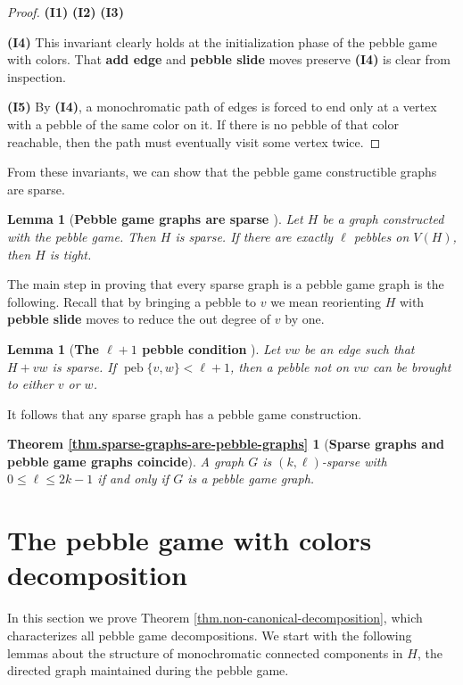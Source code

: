 \documentclass[11pt]{article}
\newtheorem{lemma}[theorem]{Lemma}
\newcommand{\refthm}[1]{Theorem \ref{thm.#1}}
\newcommand{\labellem}[1]{\label{lem.#1}}
\newcommand{\restateenv}{ZZZ}
\newenvironment{restate}[1]{
  \renewcommand{\restateenv}{restate.#1}
  \newtheorem*{\restateenv}{\refthm{#1}}
  \begin{\restateenv}
}{\end{\restateenv}}
\newcommand{\peb}{\ensuremath{\operatorname{peb}}}
\begin{document}
	\begin{proof}
		{\bf (I1)} \cite{LeSt05}
		{\bf (I2)} \cite{LeSt05}
		{\bf (I3)} \cite{LeSt05}
		
		{\bf (I4)} This invariant clearly holds at the initialization phase of the pebble game with colors. That {\bf add edge} and {\bf pebble slide} moves preserve {\bf (I4)} is clear from inspection. 
		
		{\bf (I5)} By {\bf (I4)}, a monochromatic path of edges is forced to end only at a vertex with a pebble of the same color on it. If there is no pebble of that color reachable, then the path must eventually visit some vertex twice. 
	\end{proof}
	
	From these invariants, we can show that the pebble game constructible graphs are sparse.
\begin{lemma}[{\bf Pebble game graphs are sparse \cite{LeSt05}}]\labellem{pebble-graphs-are-sparse}
		Let $H$ be a graph constructed with the pebble game. Then $H$ is sparse. 
		If there are exactly $\ell$ pebbles on $V(H)$, then $H$ is tight.  
\end{lemma}

The main step in proving that every sparse graph is a pebble game graph is the following.  Recall
that by bringing a pebble to $v$ we mean reorienting $H$ with {\bf pebble slide} moves to reduce the 
out degree of $v$ by one.
\begin{lemma}[{\bf The $\ell+1$ pebble condition} \cite{LeSt05}]\labellem{can-bring-another-pebble}
Let $vw$ be an edge such that $H+vw$ is sparse. If $\peb \{v,w\}<\ell+1$, 
then a pebble not on $vw$ can be brought to either $v$ or $w$.  
\end{lemma}

It  follows that any sparse graph has a pebble game construction. 
\begin{restate}{sparse-graphs-are-pebble-graphs}[{\bf Sparse graphs and pebble game graphs coincide}]
A graph $G$  is $(k,\ell)$-sparse  with $0\le\ell\le 2k-1$ if and only if $G$ is a pebble game graph.
\end{restate}

\section{The pebble game with colors decomposition}\label{pg-decomp}
In this section we prove \refthm{non-canonical-decomposition}, which characterizes
all pebble game decompositions.
We start with the following lemmas about the structure of monochromatic connected components in $H$,
the directed graph maintained during the pebble game.
	
\end{document}
